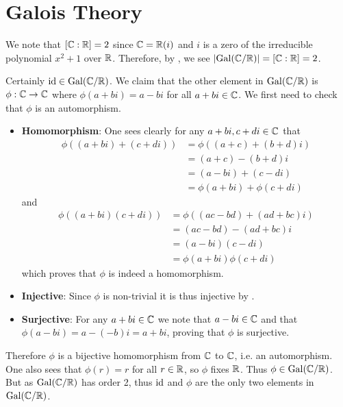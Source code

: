 \section{Galois Theory}
\begin{questions}
    \item \begin{partquestions}{\roman*}
        \item We note that $[\mathbb{C}:\mathbb{R}] = 2$ since $\mathbb{C} = \mathbb{R}(i)$ and $i$ is a zero of the irreducible polynomial $x^2 + 1$ over $\mathbb{R}$. Therefore, by , we see $|\mathrm{Gal}(\mathbb{C}/\mathbb{R})| = [\mathbb{C}:\mathbb{R}] = 2$.

        \item Certainly $\mathrm{id} \in \mathrm{Gal}(\mathbb{C}/\mathbb{R})$. We claim that the other element in $\mathrm{Gal}(\mathbb{C}/\mathbb{R})$ is $\phi: \mathbb{C} \to \mathbb{C}$ where $\phi(a+bi) = a-bi$ for all $a+bi \in \mathbb{C}$. We first need to check that $\phi$ is an automorphism.
        \begin{itemize}
            \item \textbf{Homomorphism}: One sees clearly for any $a+bi, c+di \in \mathbb{C}$ that
            \begin{align*}
                \phi((a+bi)+(c+di)) &= \phi((a+c)+(b+d)i)\\
                &= (a+c)-(b+d)i\\
                &= (a-bi) + (c-di)\\
                &= \phi(a+bi) + \phi(c+di)
            \end{align*}
            and
            \begin{align*}
                \phi((a+bi)(c+di)) &= \phi((ac-bd) + (ad+bc)i)\\
                &= (ac-bd) - (ad+bc)i\\
                &= (a-bi)(c-di)\\
                &= \phi(a+bi)\phi(c+di)
            \end{align*}
            which proves that $\phi$ is indeed a homomorphism.

            \item \textbf{Injective}: Since $\phi$ is non-trivial it is thus injective by .

            \item \textbf{Surjective}: For any $a + bi \in \mathbb{C}$ we note that $a - bi \in \mathbb{C}$ and that $\phi(a - bi) = a - (-b)i = a+bi$, proving that $\phi$ is surjective.
        \end{itemize}
        Therefore $\phi$ is a bijective homomorphism from $\mathbb{C}$ to $\mathbb{C}$, i.e. an automorphism. One also sees that $\phi(r) = r$ for all $r \in \mathbb{R}$, so $\phi$ fixes $\mathbb{R}$. Thus $\phi \in \mathrm{Gal}(\mathbb{C}/\mathbb{R})$. But as $\mathrm{Gal}(\mathbb{C}/\mathbb{R})$ has order 2, thus $\mathrm{id}$ and $\phi$ are the only two elements in $\mathrm{Gal}(\mathbb{C}/\mathbb{R})$.
    \end{partquestions}


\end{questions}
